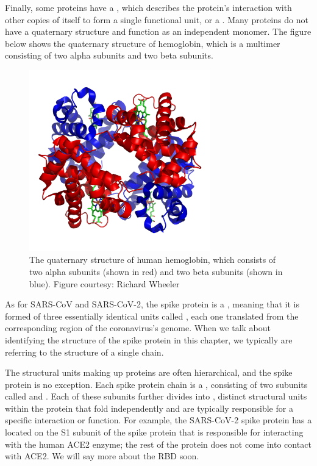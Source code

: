 {Finally, some proteins have a , which describes the protein’s interaction with other copies of itself to form a single functional unit, or a . Many proteins do not have a quaternary structure and function as an independent monomer. The figure below shows the quaternary structure of hemoglobin, which is a multimer consisting of two alpha subunits and two beta subunits.

\begin{figure}[h]
	\centering
	\mySfFamily
	\includegraphics[width = 0.7\textwidth]{../images/hemoglobin_quaternary_structure.png}
	\caption{The quaternary structure of human hemoglobin, which consists of two alpha subunits (shown in red) and two beta subunits (shown in blue). Figure courtesy: Richard Wheeler}
	\label{fig:hemoglobin_quaternary_structure}
\end{figure}

As for SARS-CoV and SARS-CoV-2, the spike protein is a , meaning that it is formed of three essentially identical units called , each one translated from the corresponding region of the coronavirus's genome. When we talk about identifying the structure of the spike protein in this chapter, we typically are referring to the structure of a single chain.

The structural units making up proteins are often hierarchical, and the spike protein is no exception. Each spike protein chain is a , consisting of two subunits called  and . Each of these subunits further divides into , distinct structural units within the protein that fold independently and are typically responsible for a specific interaction or function. For example, the SARS-CoV-2 spike protein has a  located on the S1 subunit of the spike protein that is responsible for interacting with the human ACE2 enzyme; the rest of the protein does not come into contact with ACE2. We will say more about the RBD soon.

}
